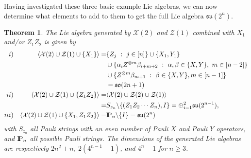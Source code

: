 \documentclass[12pt, a4-paper]{amsart}
\newcommand{\cX}{\mathcal{X}}
\newcommand{\cZ}{\mathcal{Z}}
\newcommand{\mf}[1]{\mathfrak{#1}}
\numberwithin{equation}{section}
\newcommand{\PP}{{\rm I\! P}}
\newtheorem{theorem}[lemma]{Theorem}
\begin{document}
Having investigated these three basic example Lie algebras, we can now determine what elements to add to them to get the full Lie algebra $\mathfrak{su}(2^n)$.

\begin{theorem}\label{thm:XdoubleZsingle_extensions}
    The Lie algebra generated by $\cX(2)$ and $\cZ(1)$ combined with $X_1$ and/or $Z_1 Z_2$ is given by
    \begin{equation*}
    \begin{aligned}
        i) && \langle \cX(2) \cup \cZ(1) \cup \{X_1\} \rangle =& \{Z_j ~:~ j \in [n]\} \cup \{X_1, Y_1\} \\ 
        &&& \cup \{\alpha_i Z^{\otimes m} \beta_{i+m+2} ~:~ \alpha, \beta \in \{X,Y\},~ m \in [n-2] \} \\
        &&& \cup \{Z^{\otimes m} \beta_{m+1} ~:~ \beta \in \{X,Y\}, m \in [n-1] \}  \\
        &&& = \mf{so}(2n+1)\\
        ii) && \langle \cX(2) \cup \cZ(1) \cup \{Z_1 Z_2\} \rangle =& \langle \cX(2) \cup \cZ(2) \cup \cZ(1) \rangle  \\
        && =& S_{z_n} \backslash \{(Z_1 Z_2 \cdots Z_n), I\} = \oplus_{i=1}^2 \mf{su}(2^{n-1}), \\
        iii) && \langle \cX(2) \cup \cZ(1) \cup \{X_1, Z_1 Z_2\} \rangle =& \PP_n \backslash \{I \} = \mf{su}(2^n)
    \end{aligned}
    \end{equation*}
    with $S_{z_n}$ all Pauli strings with an even number of Pauli $X$ and Pauli $Y$ operators, and $\PP_n$ all possible Pauli strings. The dimensions of the generated Lie algebras are respectively $2n^2+n$, $2( 4^{n-1}-1)$, and $4^n-1$ for $n\geq 3$.
\end{theorem}
\end{document}
